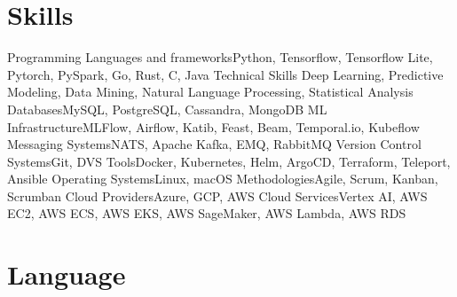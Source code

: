 \section{Skills}

\cvline%
{Programming Languages and frameworks}{Python, Tensorflow, Tensorflow Lite, Pytorch, PySpark, Go, Rust, C, Java}
\cvline%
{Technical Skills} {Deep Learning, Predictive Modeling, Data Mining, Natural Language Processing, Statistical Analysis}
\cvline%
{Databases}{MySQL, PostgreSQL, Cassandra, MongoDB}
\cvline%
{ML Infrastructure}{MLFlow, Airflow, Katib, Feast, Beam, Temporal.io, Kubeflow}
\cvline%
{Messaging Systems}{NATS, Apache Kafka, EMQ, RabbitMQ}
\cvline%
{Version Control Systems}{Git, DVS}
\cvline%
{Tools}{Docker, Kubernetes, Helm, ArgoCD, Terraform, Teleport, Ansible}
\cvline%
{Operating Systems}{Linux, macOS}
\cvline%
{Methodologies}{Agile, Scrum, Kanban, Scrumban}
\cvline%
{Cloud Providers}{Azure, GCP, AWS}
\cvline%
{Cloud Services}{Vertex AI, AWS EC2, AWS ECS, AWS EKS, AWS SageMaker, AWS Lambda, AWS RDS}

\section{Language}


\emptysection{}\closesection{}
